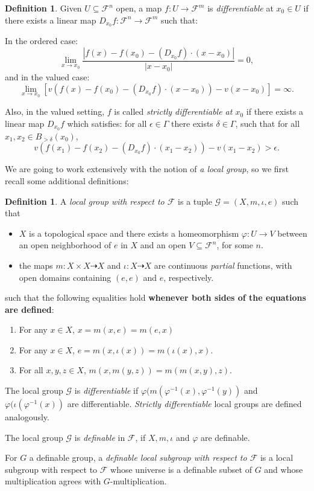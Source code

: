 \documentclass[11pt]{amsart}
\theoremstyle{definition}
\newtheorem{definition}[theorem]{Definition}
\newcommand{\CF}{{\mathscr F}}
\newcommand{\0}{\emptyset}
\renewcommand{\phi}{\varphi}
\def\sub{\subseteq}
\begin{document}
\begin{definition}
Given $U\subseteq \CF^n$ open, a map $f:U\to \CF^m$ is \emph{differentiable} at $x_0\in U$ if there exists a linear map $D_{x_0}f:\CF^n\to \CF^m$ such that:

\noindent In the ordered case:
\[\lim_{x\to x_0}\frac{|f(x)-f(x_0)-(D_{x_0}f)\cdot (x-x_0)|}{|x-x_0|}=0,\]
and in the valued case:
\[\lim_{x\to x_0}\left[ v(f(x)-f(x_0)-(D_{x_0}f)\cdot (x-x_0))-v(x-x_0)\right]=\infty.\]

Also, in the valued setting, $f$ is called {\em strictly differentiable at $x_0$} if there exists a linear map $D_{x_0}f$ which satisfies: for all $\epsilon\in \Gamma$ there exists $\delta\in \Gamma$, such that for all $x_1,x_2\in B_{>\delta}(x_0)$, 
\[v(f(x_1)-f(x_2)-(D_{x_0}f)\cdot(x_1-x_2))-v(x_1-x_2)>\epsilon.\]


 \end{definition}


We are going to work extensively with the notion of {\em a local group}, so we first recall some additional  definitions: 

\begin{definition} \label{D: loc gp}
A \emph{local group with respect to $\CF$} is a tuple $\mathcal{G}=(X,m,\iota,e)$ such that 
\begin{itemize}
   \item $X$ is a topological space and there exists a homeomorphism  $\phi: U\to V$  between an  open neighborhood of $e$ in $X$ and  an open $V\sub \CF^n$, for some $n$. 
    \item  the maps $m:X\times X\dashrightarrow X$ and $\iota:X\dashrightarrow X$ are continuous \textit{partial} functions, with open domains containing $(e,e)$ and $e$, respectively.
     
\end{itemize}
such that the following equalities hold \textbf{whenever both sides of the equations are defined}:
\begin{enumerate}
    \item For any $x\in X$, $x=m(x,e)=m(e,x)$
    \item For any $x\in X$, $e=m(x,\iota(x))=m(\iota(x),x)$.
    \item For all $x,y,z\in X$, $m(x,m(y,z))=m(m(x,y),z)$.
\end{enumerate}

The local group $\mathcal{G}$ is  {\em differentiable}  if  $\phi( m(\phi^{-1}(x), \phi^{-1}(y))$  and $\phi (\iota(\phi^{-1}(x))$  are differentiable. {\em Strictly differentiable} local groups are defined analogously.  

The local group  $\mathcal{G}$ is \emph{definable} in $\CF$, if $X,m,\iota$ and $\varphi$ are definable. 
\vspace{.2cm}

For $G$  a definable group,  a \emph{definable local subgroup with respect to $\CF$} is a local subgroup with respect to $\CF$ whose universe is a definable subset of $G$ and whose multiplication agrees with $G$-multiplication.
\end{definition}
\end{document}
